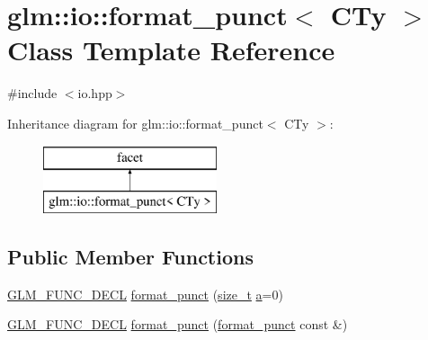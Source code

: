 \hypertarget{classglm_1_1io_1_1format__punct}{}\section{glm\+:\+:io\+:\+:format\+\_\+punct$<$ C\+Ty $>$ Class Template Reference}
\label{classglm_1_1io_1_1format__punct}


{\ttfamily \#include $<$io.\+hpp$>$}

Inheritance diagram for glm\+:\+:io\+:\+:format\+\_\+punct$<$ C\+Ty $>$\+:\begin{figure}[H]
\begin{center}
\leavevmode
\includegraphics[height=2.000000cm]{classglm_1_1io_1_1format__punct}
\end{center}
\end{figure}
\subsection*{Public Member Functions}
\begin{DoxyCompactItemize}
\item 
\hyperlink{setup_8hpp_ab2d052de21a70539923e9bcbf6e83a51}{G\+L\+M\+\_\+\+F\+U\+N\+C\+\_\+\+D\+E\+CL} \hyperlink{classglm_1_1io_1_1format__punct_ae56e7a14fac2516658837281b9da4659}{format\+\_\+punct} (\hyperlink{_s_d_l__config__winrt_8h_a7c94ea6f8948649f8d181ae55911eeaf}{size\+\_\+t} \hyperlink{_s_d_l__opengl__glext_8h_a3309789fc188587d666cda5ece79cf82}{a}=0)
\item 
\hyperlink{setup_8hpp_ab2d052de21a70539923e9bcbf6e83a51}{G\+L\+M\+\_\+\+F\+U\+N\+C\+\_\+\+D\+E\+CL} \hyperlink{classglm_1_1io_1_1format__punct_a89a8c3cfb0b975f3dd8c0416101c59b7}{format\+\_\+punct} (\hyperlink{classglm_1_1io_1_1format__punct}{format\+\_\+punct} const \&)
\end{DoxyCompactItemize}
